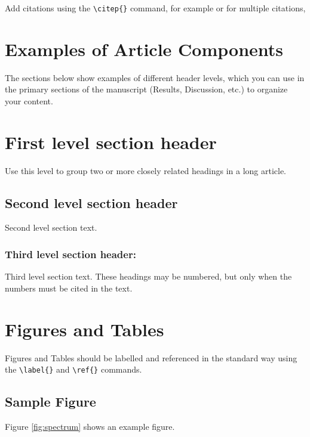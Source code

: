\documentclass[9pt,twocolumn,twoside]{gsajnl}
\begin{document}
Add citations using the \verb|\citep{}| command, for example \citep{neher2013genealogies} or for multiple citations, \citep{neher2013genealogies, rodelsperger2014characterization}

\section{Examples of Article Components}
\label{sec:examples}

The sections below show examples of different header levels, which you can use in the primary sections of the manuscript (Results, Discussion, etc.) to organize your content.

\section{First level section header}

Use this level to group two or more closely related headings in a long article.

\subsection{Second level section header}

Second level section text.

\subsubsection{Third level section header:}

Third level section text. These headings may be numbered, but only when the numbers must be cited in the text. 

\section{Figures and Tables}

Figures and Tables should be labelled and referenced in the standard way using the \verb|\label{}| and \verb|\ref{}| commands.

\subsection{Sample Figure}

Figure \ref{fig:spectrum} shows an example figure.
\end{document}
